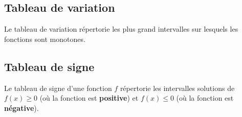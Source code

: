 \documentclass{article}
\begin{document}
\subsection{Tableau de variation}
\begin{definition}
Le tableau de variation répertorie les plus grand intervalles sur lesquels les fonctions sont monotones. 
\end{definition}
\begin{example}
\hfill

\vspace*{0.2cm}
\begin{minipage}{0.45\textwidth}
\end{minipage}
\hfill\vline\hfill
\begin{minipage}{0.45\textwidth}
\end{minipage}
\end{example}
\subsection{Tableau de signe}
\begin{definition}
Le tableau de signe d'une fonction $f$ répertorie les intervalles solutions de $f(x) \geq 0$ (où la fonction est \textbf{positive}) et $f(x) \leq 0$ (où la fonction est \textbf{négative}).
\end{definition}
\begin{example}
\hfill

\vspace*{0.2cm}
\begin{minipage}{0.45\textwidth}
\end{minipage}
\hfill\vline\hfill
\begin{minipage}{0.45\textwidth}
\end{minipage}
\end{example}
\newpage
\end{document}
